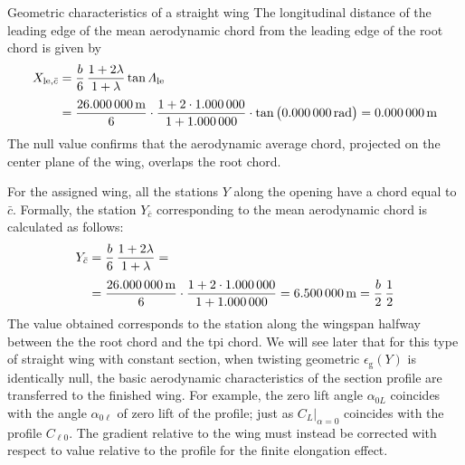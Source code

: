 \documentclass[[12pt,twoside]{book}
\begin{document}
\begin{myExampleX}{Geometric characteristics of a straight wing}{}
\noindent
The longitudinal distance of the leading edge of the mean aerodynamic chord from the
leading edge of the root chord is given by
\[
\begin{split}
X_{\mathrm{le},\bar{c}} 
  & {}=
    \frac{b}{6} \, \frac{1+2\lambda}{1+\lambda} \tan\Lambda_\mathrm{le} \\[3pt]
  & {}=
    \frac{\SI[round-precision=1]{\mySpanWingMT}{\metre}}{6}
      \cdot 
      \frac{
        1 + 2\cdot\SI[round-precision=0]{\myTaperRatioWing}{}
      }{
        1 + \SI[round-precision=0]{\myTaperRatioWing}{}
      }
      \cdot \tan \big( \SI[round-precision=0]{\myLambdaLERad}{\radian} \big)
    = { \SI[round-precision=0]{\myXLEMACWingMT}{\metre} }%
\end{split}
\]
The null value confirms that the aerodynamic average chord, projected on the center plane
of the wing, overlaps the root chord.

\noindent
For the assigned wing, all the stations $ Y $ along the opening have a chord equal to $ \bar{c} $.
Formally, the station $ Y _ {\bar{c}} $ corresponding to the mean aerodynamic chord
is calculated as follows:
\[
\begin{split}
Y_{\bar{c}} 
  & {}=
    \frac{b}{6} \, \frac{1+2\lambda}{1+\lambda} = \\[3pt]
  & {}=
    \frac{\SI[round-precision=1]{\mySpanWingMT}{\metre}}{6}
      \cdot 
      \frac{
        1 + 2\cdot\SI[round-precision=2]{\myTaperRatioWing}{}
      }{
        1 + \SI[round-precision=2]{\myTaperRatioWing}{}
      }
    = { \SI[round-precision=2]{\myYMACWingMT}{\metre} }
    = \frac{b}{2} \, \frac{1}{2}
\end{split}
\]
The value obtained corresponds to the station along the wingspan halfway between the
the root chord and the tpi chord.
We will see later that for this type of straight wing with constant section, when twisting
geometric $ \epsilon_\mathrm {g} (Y) $ is identically null,
the basic aerodynamic characteristics of the section profile are transferred to the finished wing.
For example, the zero lift angle $\alpha_ {0L} $ coincides with the angle $ \alpha_ {0 \ell} $
of zero lift of the profile; just as $C_L \big|_{\alpha = 0} $ coincides with the profile $ C _ {\ell 0} $.
The gradient  relative to the wing must instead be corrected with respect to
 value relative to the profile for the finite elongation effect.

\end{myExampleX}
\end{document}
